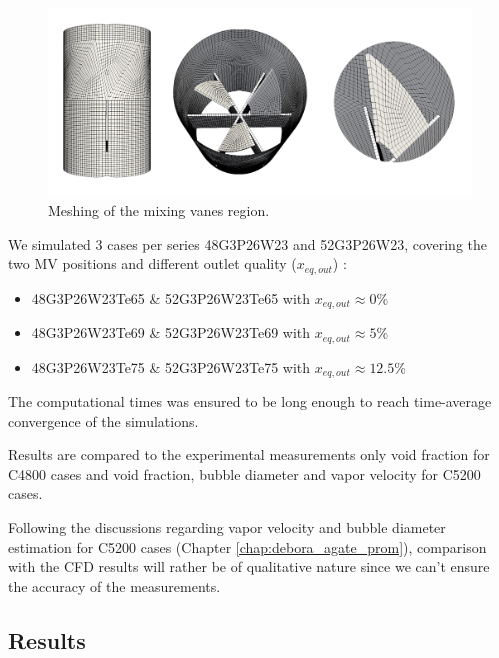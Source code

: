 %
\begin{figure}[!h]
\centering
\includegraphics[width=1.0\linewidth]{img/DEBORA-Promoteur/cfd/prom_M2_all.png}
\caption{Meshing of the mixing vanes region.}
\label{fig:prom_M2}
\end{figure}
%

\npar


We simulated 3 cases per series 48G3P26W23 and 52G3P26W23, covering the two MV positions and different outlet quality ($x_{eq,out}$) :

\begin{itemize}
\item 48G3P26W23Te65 \& 52G3P26W23Te65 with $x_{eq,out}\approx 0\%$ 
\item 48G3P26W23Te69 \& 52G3P26W23Te69 with $x_{eq,out}\approx 5\%$ 
\item 48G3P26W23Te75 \& 52G3P26W23Te75 with $x_{eq,out}\approx 12.5\%$ 
\end{itemize}

\begin{note*}{}
The computational times was ensured to be long enough to reach time-average convergence of the simulations.
\end{note*}


Results are compared to the experimental measurements \ie only void fraction for C4800 cases and void fraction, bubble diameter and vapor velocity for C5200 cases.

\begin{remark*}{}
Following the discussions regarding vapor velocity and bubble diameter estimation for C5200 cases (Chapter \ref{chap:debora_agate_prom}), comparison with the CFD results will rather be of qualitative nature since we can't ensure the accuracy of the measurements.
\end{remark*}


\subsection{Results}

